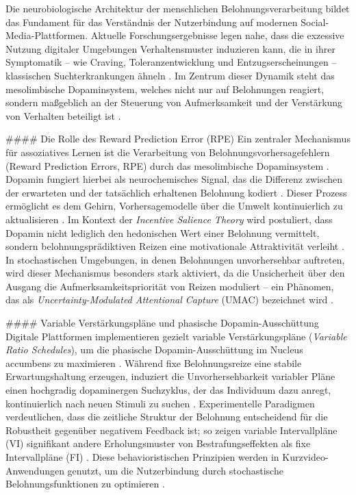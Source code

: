 \documentclass[11pt,a4paper]{article}
\begin{document}
Die neurobiologische Architektur der menschlichen Belohnungsverarbeitung bildet das Fundament für das Verständnis der Nutzerbindung auf modernen Social-Media-Plattformen. Aktuelle Forschungsergebnisse legen nahe, dass die exzessive Nutzung digitaler Umgebungen Verhaltensmuster induzieren kann, die in ihrer Symptomatik – wie Craving, Toleranzentwicklung und Entzugserscheinungen – klassischen Suchterkrankungen ähneln \autocite{crossref_10_51473_rcmos_v1i2_2025_1736}. Im Zentrum dieser Dynamik steht das mesolimbische Dopaminsystem, welches nicht nur auf Belohnungen reagiert, sondern maßgeblich an der Steuerung von Aufmerksamkeit und der Verstärkung von Verhalten beteiligt ist \autocite{crossref_10_51473_rcmos_v1i2_2025_1736}.

\#\#\#\# Die Rolle des Reward Prediction Error (RPE) Ein zentraler Mechanismus für assoziatives Lernen ist die Verarbeitung von Belohnungsvorhersagefehlern (Reward Prediction Errors, RPE) durch das mesolimbische Dopaminsystem \autocite{europepmc_42137086}. Dopamin fungiert hierbei als neurochemisches Signal, das die Differenz zwischen der erwarteten und der tatsächlich erhaltenen Belohnung kodiert \autocite{europepmc_42137086}. Dieser Prozess ermöglicht es dem Gehirn, Vorhersagemodelle über die Umwelt kontinuierlich zu aktualisieren \autocite{europepmc_42137086}. Im Kontext der \textit{Incentive Salience Theory} wird postuliert, dass Dopamin nicht lediglich den hedonischen Wert einer Belohnung vermittelt, sondern belohnungsprädiktiven Reizen eine motivationale Attraktivität verleiht \autocite{europepmc_42137086}. In stochastischen Umgebungen, in denen Belohnungen unvorhersehbar auftreten, wird dieser Mechanismus besonders stark aktiviert, da die Unsicherheit über den Ausgang die Aufmerksamkeitspriorität von Reizen moduliert – ein Phänomen, das als \textit{Uncertainty-Modulated Attentional Capture} (UMAC) bezeichnet wird \autocite{europepmc_42137086}.

\#\#\#\# Variable Verstärkungspläne und phasische Dopamin-Ausschüttung Digitale Plattformen implementieren gezielt variable Verstärkungspläne (\textit{Variable Ratio Schedules}), um die phasische Dopamin-Ausschüttung im Nucleus accumbens zu maximieren \autocite{crossref_10_51473_rcmos_v1i2_2025_1736}. Während fixe Belohnungsreize eine stabile Erwartungshaltung erzeugen, induziert die Unvorhersehbarkeit variabler Pläne einen hochgradig dopaminergen Suchzyklus, der das Individuum dazu anregt, kontinuierlich nach neuen Stimuli zu suchen \autocite{crossref_10_51473_rcmos_v1i2_2025_1736}. Experimentelle Paradigmen verdeutlichen, dass die zeitliche Struktur der Belohnung entscheidend für die Robustheit gegenüber negativem Feedback ist; so zeigen variable Intervallpläne (VI) signifikant andere Erholungsmuster von Bestrafungseffekten als fixe Intervallpläne (FI) \autocite{crossref_10_3758_bf03209807,crossref_10_3758_bf03343141}. Diese behavioristischen Prinzipien werden in Kurzvideo-Anwendungen genutzt, um die Nutzerbindung durch stochastische Belohnungsfunktionen zu optimieren \autocite{crossref_10_51473_rcmos_v1i2_2025_1736}.
\end{document}
